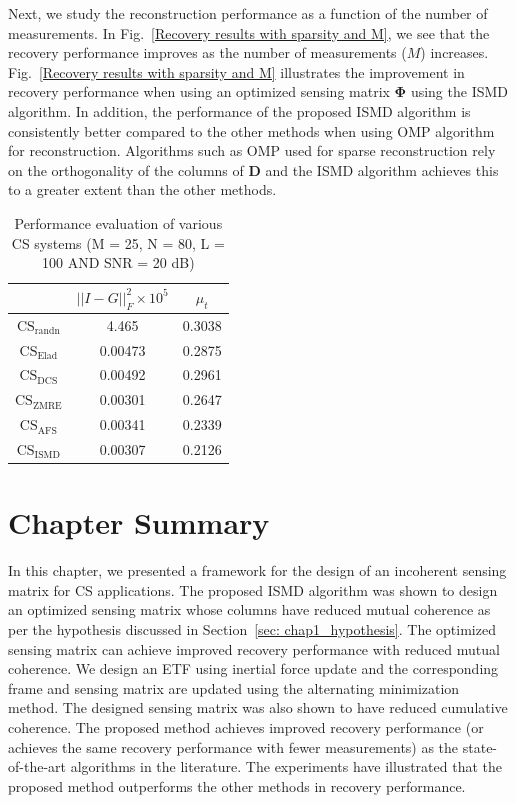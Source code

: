Next, we study the reconstruction performance as a function of the number of measurements. In Fig.~\ref{Recovery results with sparsity and M}, we see that the recovery performance improves as the number of measurements ($M$) increases. Fig.~\ref{Recovery results with sparsity and M} illustrates the improvement in recovery performance when using an optimized sensing matrix $\bm{\Phi}$ using the ISMD algorithm. In addition, the performance of the proposed ISMD algorithm is consistently better compared to the other methods when using OMP algorithm for reconstruction. Algorithms such as OMP used for sparse reconstruction rely on the orthogonality of the columns of $\bm{D}$ and the ISMD algorithm achieves this to a greater extent than the other methods.
%
\begin{table}
\renewcommand{\arraystretch}{1}
\caption{Performance evaluation of various CS systems (M = 25, N = 80, L = 100 AND SNR = 20 dB)}
\label{table: ISMD_table_example}
\centering
\begin{tabular}{|c|c|c|}
\hline
\bfseries  & \bfseries $|| I - G ||_{F}^{2} \times 10^{5}$ & \bfseries $\mu_{t}$  \\
\hline
$\text{CS}_{\text{randn}}$ & 4.465 & 0.3038\\
\hline
$\text{CS}_{\text{Elad}}$ & 0.00473 & 0.2875 \\
\hline
$\text{CS}_{\text{DCS}}$ & 0.00492 & 0.2961 \\
\hline
$\text{CS}_{\text{ZMRE}} $ & 0.00301 & 0.2647 \\
\hline
$\text{CS}_{\text{AFS}}$ & 0.00341 & 0.2339 \\
\hline
$\text{CS}_{\text{ISMD}}$ & 0.00307 & 0.2126 \\
\hline
\end{tabular}
\end{table}
%
\section{Chapter Summary}
%
In this chapter, we presented a framework for the design of an incoherent sensing matrix for CS applications. The proposed ISMD algorithm was shown to design an optimized sensing matrix whose columns have reduced mutual coherence as per the hypothesis discussed in Section~\ref{sec: chap1_hypothesis}. The optimized sensing matrix can achieve improved recovery performance with reduced mutual coherence. We design an ETF using inertial force update and the corresponding frame and sensing matrix are updated using the alternating minimization method. The designed sensing matrix was also shown to have reduced cumulative coherence. The proposed method achieves improved recovery performance (or achieves the same recovery performance with fewer measurements) as the state-of-the-art algorithms in the literature. The experiments have illustrated that the proposed method outperforms the other methods in recovery performance.